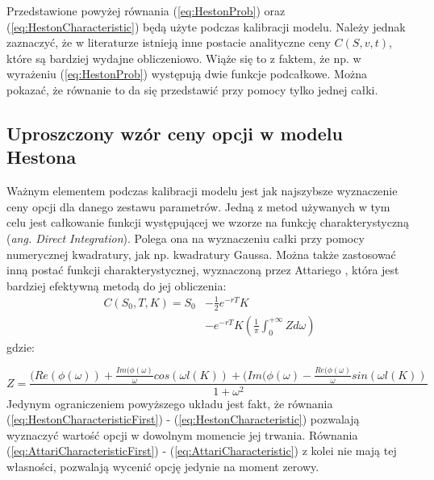 \documentclass{pracamgr}
\begin{document}
Przedstawione powyżej równania (\ref{eq:HestonProb}) oraz 
(\ref{eq:HestonCharacteristic}) będą użyte podczas kalibracji modelu. Należy jednak zaznaczyć, że 
w literaturze istnieją inne postacie analityczne ceny $C(S, v, t)$, które są bardziej wydajne 
obliczeniowo. 
Wiąże się to z faktem, że np. w wyrażeniu (\ref{eq:HestonProb}) występują dwie funkcje podcałkowe. 
Można pokazać, że równanie to da się przedstawić przy pomocy tylko jednej całki.

\subsection{Uproszczony wzór ceny opcji w modelu Hestona} %
\label{sec:numeryczne_wyznaczenie_warto_ci_funkcji_charakterystycznej}

Ważnym elementem podczas kalibracji modelu jest jak najszybsze wyznaczenie ceny opcji dla danego
zestawu parametrów. 
Jedną z metod używanych w tym celu jest całkowanie funkcji występującej we wzorze na funkcję
charakterystyczną (\textit{ang. Direct Integration}). Polega ona na wyznaczeniu całki przy pomocy
numerycznej kwadratury, jak np. kwadratury Gaussa. Można także zastosować
inną postać funkcji charakterystycznej, wyznaczoną przez Attariego \cite{Attari}, która jest bardziej efektywną metodą do jej obliczenia:
\begin{equation}
\label{eq:AttariCharacteristicFirst}
\begin{aligned}
  C(S_0, T, K) = S_0 &- \frac{1}{2} e^{-rT}K  \\ 
  &- e^{-rT} K 
  \left( \frac{1}{\pi} \int_0^{+\infty} Z d\omega \right)
    \end{aligned}
\end{equation}
gdzie:

\begin{equation}
\label{eq:AttariCharacteristic}
  Z = \frac{
(Re(\phi (\omega) )
+\frac{Im(\phi (\omega)}{\omega}
cos(\omega l (K)) +
(Im(\phi (\omega) - \frac{Re(\phi (\omega)}{\omega}
sin(\omega l (K))
}{1 + \omega^2}
\end{equation}
Jedynym ograniczeniem powyższego układu jest fakt, że równania 
(\ref{eq:HestonCharacteristicFirst}) - (\ref{eq:HestonCharacteristic}) pozwalają wyznaczyć wartość opcji w 
dowolnym momencie jej trwania. Równania 
(\ref{eq:AttariCharacteristicFirst}) - (\ref{eq:AttariCharacteristic}) z kolei nie mają tej własności, 
pozwalają wycenić opcję jedynie na moment zerowy.
\end{document}
